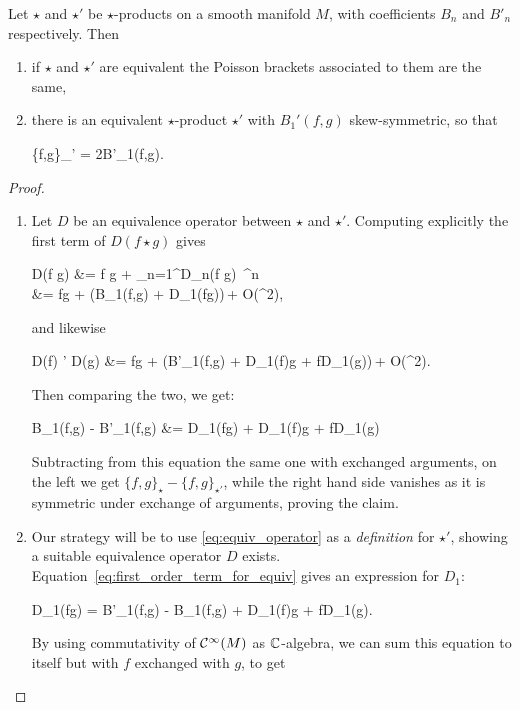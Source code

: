 \documentclass[main.tex]{subfiles}
\begin{document}
\begin{lemma}
	Let $\star$ and $\star'$ be $\star$-products on a smooth manifold $M$, with coefficients $B_n$ and $B'_n$ respectively. Then
	\begin{enumerate}
		\item if $\star$ and $\star'$ are equivalent the Poisson brackets associated to them are the same,
		\item there is an equivalent $\star$-product $\star'$ with $B_1'(f,g)$ skew-symmetric, so that
		\begin{eqalign}
			\{f,g\}_{\star'} = 2B'_1(f,g).
		\end{eqalign}
	\end{enumerate}
\end{lemma}
\begin{proof}
	\leavevmode
	\begin{enumerate}
		\item Let $D$ be an equivalence operator between $\star$ and $\star'$. Computing explicitly the first term of $D(f \star g)$ gives
		\begin{eqalign}
			D(f \star g) &= f \star g + \sum_{n=1}^\infty D_n(f \star g)\, \planck^n\\
			&= fg + (B_1(f,g) + D_1(fg))\,\planck + O(\planck^2),
		\end{eqalign}
		and likewise
		\begin{eqalign}
			D(f) \star' D(g) &= fg + (B'_1(f,g) + D_1(f)g + fD_1(g))\,\planck + O(\planck^2).
		\end{eqalign}
		Then comparing the two, we get:
		\begin{eqalign}
		\label{eq:first_order_term_for_equiv}
			B_1(f,g) - B'_1(f,g) &= D_1(fg) + D_1(f)g + fD_1(g)
		\end{eqalign}
		Subtracting from this equation the same one with exchanged arguments, on the left we get $\{f,g\}_\star - \{f,g\}_{\star'}$, while the right hand side vanishes as it is symmetric under exchange of arguments, proving the claim.
		\item Our strategy will be to use \eqref{eq:equiv_operator} as a \emph{definition} for $\star'$, showing a suitable equivalence operator $D$ exists. Equation~\eqref{eq:first_order_term_for_equiv} gives an expression for $D_1$:
		\begin{eqalign}
			D_1(fg) = B'_1(f,g) - B_1(f,g) + D_1(f)g + fD_1(g).
		\end{eqalign}
		By using commutativity of $\mathcal{C}^\infty(M)$ as $\mathbb{C}$-algebra, we can sum this equation to itself but with $f$ exchanged with $g$, to get

\end{enumerate}
\end{proof}
\end{document}

